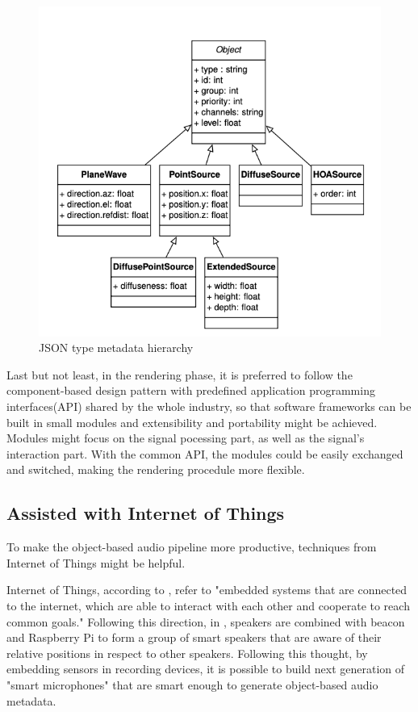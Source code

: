 \documentclass[jou]{apa6}
\begin{document}
\begin{figure}[h!]
    \includegraphics[width=\linewidth]{hierarchy.png}
    \caption{JSON type metadata hierarchy}
    \label{fig:Figure2}
\end{figure}

Last but not least, in the rendering phase, it is preferred to follow the component-based design pattern with predefined application programming interfaces(API) shared by the whole industry, so that software frameworks can be built in small modules and extensibility and portability might be achieved. Modules might focus on the signal pocessing part, as well as the signal's interaction part. With the common API, the modules could be easily exchanged and switched, making the rendering procedule more flexible.

\subsection{Assisted with Internet of Things}

To make the object-based audio pipeline more productive, techniques from Internet of Things might be helpful. 

Internet of Things, according to \textcite{turchet2018internet}, refer to "embedded systems that are connected to the internet, which are able to interact with each other and cooperate to reach common goals." Following this direction, in \textcite{lee2017location}, speakers are combined with beacon and Raspberry Pi to form a group of smart speakers that are aware of their relative positions in respect to other speakers. Following this thought, by embedding sensors in recording devices, it is possible to build next generation of "smart microphones" that are smart enough to generate object-based audio metadata. 
\end{document}
